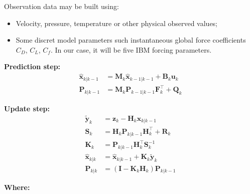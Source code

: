 Observation data may be built using:
\begin{itemize}
    \item Velocity, pressure, temperature or other physical observed values;
    \item Some discret model parameters such instantaneous global force coefficients $C_D$, $C_L$, $C_f$. In our case, it will be five IBM forcing parameters.
\end{itemize}



\textbf{Prediction step:}
\begin{align}
    \hat{\mathbf{x}}_{k|k-1} &= \mathbf{M}_k \hat{\mathbf{x}}_{k-1|k-1} + \mathbf{B}_k \mathbf{u}_k \\
    \mathbf{P}_{k|k-1} &= \mathbf{M}_k \mathbf{P}_{k-1|k-1} \mathbf{F}_k^\top + \mathbf{Q}_k
\end{align}

\vspace{1em}
\textbf{Update step:}
\begin{align}
    \tilde{\mathbf{y}}_k &= \mathbf{z}_k - \mathbf{H}_k \hat{\mathbf{x}}_{k|k-1} \\
    \mathbf{S}_k &= \mathbf{H}_k \mathbf{P}_{k|k-1} \mathbf{H}_k^\top + \mathbf{R}_k \\
    \mathbf{K}_k &= \mathbf{P}_{k|k-1} \mathbf{H}_k^\top \mathbf{S}_k^{-1} \\
    \hat{\mathbf{x}}_{k|k} &= \hat{\mathbf{x}}_{k|k-1} + \mathbf{K}_k \tilde{\mathbf{y}}_k \\
    \mathbf{P}_{k|k} &= (\mathbf{I} - \mathbf{K}_k \mathbf{H}_k) \mathbf{P}_{k|k-1}
\end{align}

\vspace{1em}
\textbf{Where:}

